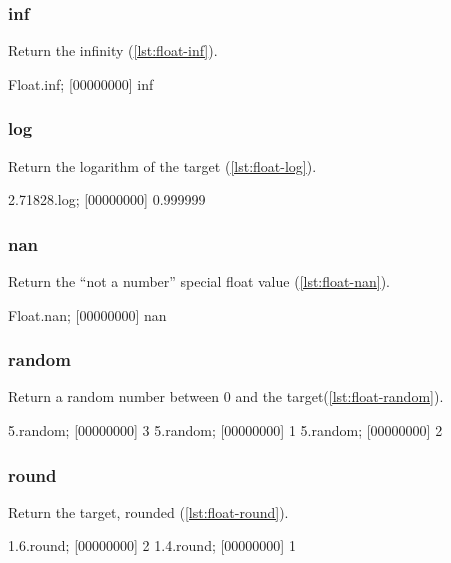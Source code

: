 \subsubsection{inf}

Return the infinity (\autoref{lst:float-inf}).

\begin{urbiscript}[caption=Float.inf, label=lst:float-inf]
Float.inf;
[00000000] inf
\end{urbiscript}

\subsubsection{log}

Return the logarithm of the target (\autoref{lst:float-log}).

\begin{urbiscript}[caption=Float.log, label=lst:float-log]
2.71828.log;
[00000000] 0.999999
\end{urbiscript}

\subsubsection{nan}

Return the ``not a number'' special float value (\autoref{lst:float-nan}).

\begin{urbiscript}[caption=Float.nan, label=lst:float-nan]
Float.nan;
[00000000] nan
\end{urbiscript}

\subsubsection{random}

Return a random number between 0 and the target(\autoref{lst:float-random}).

\begin{urbiscript}[caption=Float.random, label=lst:float-random]
5.random;
[00000000] 3
5.random;
[00000000] 1
5.random;
[00000000] 2
\end{urbiscript}

\subsubsection{round}

Return the target, rounded (\autoref{lst:float-round}).

\begin{urbiscript}[caption=Float.round, label=lst:float-round]
1.6.round;
[00000000] 2
1.4.round;
[00000000] 1
\end{urbiscript}

